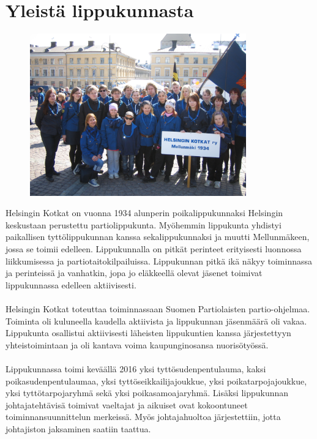\section{Yleistä lippukunnasta}
\begin{figure}[htb]
	\begin{center}
		\includegraphics[height=7cm]{paraatissa.jpg}
	\end{center}
	\captionsetup{labelformat=empty}
\end{figure}

Helsingin Kotkat on vuonna 1934 alunperin poikalippukunnaksi Helsingin keskustaan perustettu partiolippukunta. Myöhemmin lippukunta yhdistyi paikallisen tyttölippukunnan kanssa sekalippukunnaksi ja muutti Mellunmäkeen, jossa se toimii edelleen. Lippukunnalla on pitkät perinteet erityisesti luonnossa liikkumisessa ja partiotaitokilpailuissa. Lippukunnan pitkä ikä näkyy toiminnassa ja perinteissä ja vanhatkin, jopa jo eläkkeellä olevat jäsenet toimivat lippukunnassa edelleen aktiivisesti.\\
\\Helsingin Kotkat toteuttaa toiminnassaan Suomen Partiolaisten partio-ohjelmaa. Toiminta oli kuluneella kaudella aktiivista ja lippukunnan jäsenmäärä oli vakaa. Lippukunta osallistui aktiivisesti läheisten lippukuntien kanssa järjestettyyn yhteistoimintaan ja oli kantava voima kaupunginosansa nuorisötyössä.\\
\\Lippukunnassa toimi keväällä 2016 yksi tyttösudenpentulauma, kaksi poikasudenpentulaumaa, yksi tyttöseikkailijajoukkue, yksi poikatarpojajoukkue, yksi tyttötarpojaryhmä sekä yksi poikasamoajaryhmä. Lisäksi lippukunnan johtajatehtävisä toimivat vaeltajat ja aikuiset ovat kokoontuneet toiminnansuunnittelun merkeissä. Myös johtajahuoltoa järjestettiin, jotta johtajiston jaksaminen saatiin taattua. 
\newpage

